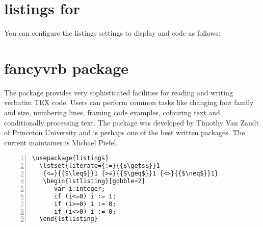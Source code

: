 

\section{listings for \latex}
You can configure the listings settings to display \tex and \latex code as follows:


\begin{teX}
\def\Removeelement123{%
  \def\reserved@a##1,#1,##2\reserved@a{##1,##2\reserved@b}%
  \def\reserved@b##1,\reserved@b##2\reserved@b{%
  \ifx,##1\@empty\else##1\fi}%
  \edef#3{%
  \expandafter\reserved@b\reserved@a,#2,\reserved@b,#1,\reserved@a}}
\end{teX}



\section{fancyvrb package}
The  package provides very sophisticated facilities for reading and writing verbatim
TEX code. Users can perform common tasks like changing font family and
size, numbering lines, framing code examples, colouring text and conditionally
processing text. The package was developed by Timothy Van Zandt of Princeton University and is perhaps
one of the best written packages. The current maintainer is Michael Piefel. 



\renewcommand{\theFancyVerbLine}{%
 \textcolor{black}{\scriptsize
 \thesection.\arabic{FancyVerbLine}}}
\large
\begin{Verbatim}[formatcom=\color{orange}, numbers=left, showspaces=false, baselinestretch=1.0,
    xleftmargin=0mm,  fontfamily=tt,  label= The listings package, numberblanklines=false
]
  \usepackage{listings}
  \lstset{literate={:=}{{$\gets$}}1
   {<=}{{$\leq$}}1 {>=}{{$\geq$}}1 {<>}{{$\neq$}}1}
   \begin{lstlisting}[gobble=2]
      var i:integer;
      if (i<=0) i := 1;
      if (i>=0) i := 0;
      if (i<>0) i := 0;
  \end{lstlisting}
\end{Verbatim}

